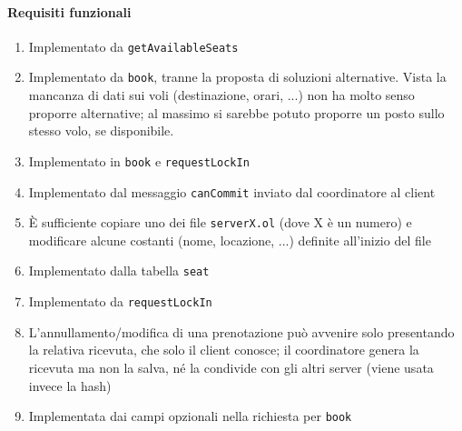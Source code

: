 \documentclass[a4paper]{article}
\begin{document}
\paragraph{Requisiti funzionali}
\begin{enumerate}
		\item Implementato da \texttt{getAvailableSeats}
		\item Implementato da \texttt{book}, tranne la proposta di soluzioni alternative. Vista la mancanza di dati sui voli (destinazione, orari, ...) non ha molto senso proporre alternative; al massimo si sarebbe potuto proporre un posto sullo stesso volo, se disponibile.
		\item Implementato in \texttt{book} e \texttt{requestLockIn}
		\item Implementato dal messaggio \texttt{canCommit} inviato dal coordinatore al client
		\item \`E sufficiente copiare uno dei file \texttt{serverX.ol} (dove X è un numero) e modificare alcune costanti (nome, locazione, ...) definite all'inizio del file
		\item Implementato dalla tabella \texttt{seat}
		\item Implementato da \texttt{requestLockIn}
		\item L'annullamento/modifica di una prenotazione può avvenire solo presentando la relativa ricevuta, che solo il client conosce; il coordinatore genera la ricevuta ma non la salva, né la condivide con gli altri server (viene usata invece la hash)
		\item Implementata dai campi opzionali nella richiesta per \texttt{book}
		
\end{enumerate}
\end{document}
